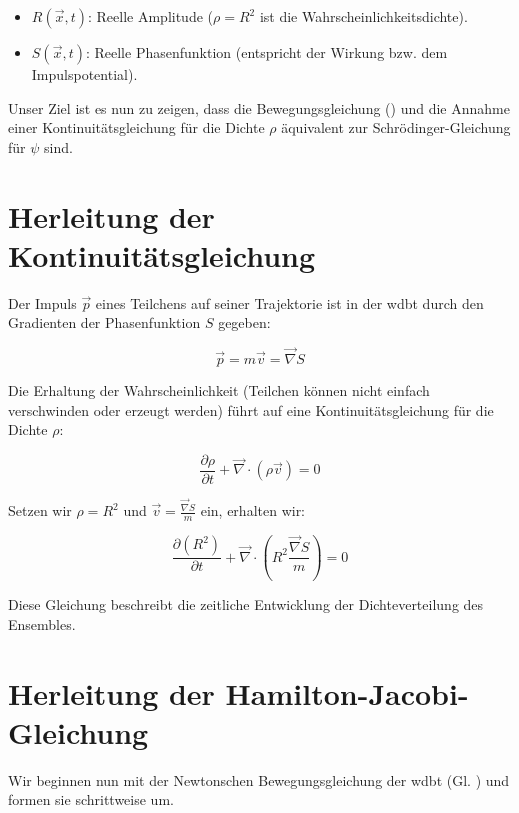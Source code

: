 \begin{itemize}
    \item $R(\vec{x},t)$: Reelle Amplitude ($\rho = R^2$ ist die Wahrscheinlichkeitsdichte).
    \item $S(\vec{x},t)$: Reelle Phasenfunktion (entspricht der Wirkung bzw. dem Impulspotential).
\end{itemize}

Unser Ziel ist es nun zu zeigen, dass die Bewegungsgleichung () und die Annahme einer Kontinuitätsgleichung für die Dichte $\rho$ äquivalent zur
Schrödinger-Gleichung für $\psi$ sind.

\section{Herleitung der Kontinuitätsgleichung}
\label{sec:kontinuitätsgleichung}
Der Impuls $\vec{p}$ eines Teilchens auf seiner Trajektorie ist in der \gls{wdbt} durch den Gradienten der Phasenfunktion $S$ gegeben:

\begin{equation}
    \label{eq:impuls}
    \vec{p} = m \vec{v} = \vec{\nabla} S
\end{equation}

Die Erhaltung der Wahrscheinlichkeit (Teilchen können nicht einfach verschwinden oder erzeugt werden) führt auf eine Kontinuitätsgleichung für die Dichte $\rho$:

\begin{equation}
    \frac{\partial \rho}{\partial t} + \vec{\nabla} \cdot (\rho \vec{v}) = 0
\end{equation}

Setzen wir $\rho = R^2$ und $\vec{v} = \frac{\vec{\nabla} S}{m}$ ein, erhalten wir:

\begin{equation}
    \label{eq:kontinuitätsgleichung}
    \frac{\partial (R^2)}{\partial t} + \vec{\nabla} \cdot \left( R^2 \frac{\vec{\nabla} S}{m} \right) = 0
\end{equation}

Diese Gleichung beschreibt die zeitliche Entwicklung der Dichteverteilung des Ensembles.

\section{Herleitung der Hamilton-Jacobi-Gleichung}
\label{sec:hamilton_jakobi_gleichung}
Wir beginnen nun mit der Newtonschen Bewegungsgleichung der \gls{wdbt} (Gl. ) und formen sie schrittweise um.

